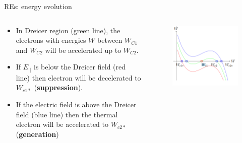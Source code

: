 \documentclass{beamer}
\begin{document}
\begin{frame}{REs: energy evolution}
	
	\scriptsize
	\begin{columns}
        \begin{column}{0.4\textwidth}
               \begin{itemize}
                \item In Dreicer region (green line), the electrons with energies $W$ between $W_{C1}$ and $W_{C2}$ will be accelerated up to $W_{C2}$.
                \item If $E_{||}$ is below the Dreicer field (red line) then electron will be decelerated to $W_{c1*}$ (\textbf{{\color{red}suppression}}). 
                \item If the electric field is above the Dreicer field (blue line) then the thermal electron will be accelerated to $W_{c2*}$ (\textbf{{\color{blue}generation}})
            \end{itemize}
        \end{column}
        
        \begin{column}{0.6\textwidth}  %
        
        \begin{figure}
            \vspace*{-0.6cm}
            \centering
        	\includegraphics[width=1\linewidth]{Chapter2Fig/energy_evolution.png}


\end{figure}
\end{column}
\end{columns}
\end{frame}
\end{document}
